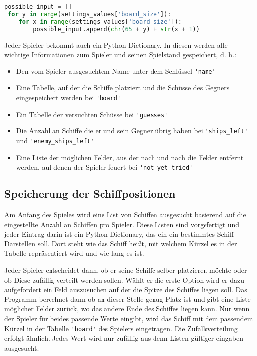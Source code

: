 \documentclass{article}
\begin{document}
\begin{lstlisting}[language=Python, caption = Herstellung einer Liste allen möglichen Felder, label=lst:possible input]
 possible_input = []
 for y in range(settings_values['board_size']):
    for x in range(settings_values['board_size']):
        possible_input.append(chr(65 + y) + str(x + 1))
\end{lstlisting}

    Jeder Spieler bekommt auch ein Python-Dictionary. In diesen werden alle wichtige Informationen zum Spieler und seinen Spielstand gespeichert, d. h.:

\setlist{}%
\begin{itemize}
\itemsep0em
  \item Den vom Spieler ausgesuchtem Name unter dem Schlüssel \verb$'name'$
  \item Eine Tabelle, auf der die Schiffe platziert und die Schüsse des Gegners eingespeichert werden bei \verb$'board'$
  \item Ein Tabelle der versuchten Schüsse bei \verb$'guesses'$
  \item Die Anzahl an Schiffe die er und sein Gegner übrig haben bei \verb$'ships_left'$ und \verb$'enemy_ships_left'$
  \item Eine Liste der möglichen Felder, aus der nach und nach die Felder entfernt werden, auf denen der Spieler feuert bei \verb$'not_yet_tried'$
\end{itemize}

\subsection{Speicherung der Schiffpositionen}
    Am Anfang des Spieles wird eine List von Schiffen ausgesucht basierend auf die eingestellte Anzahl an Schiffen pro Spieler. Diese Listen sind vorgefertigt und jeder Eintrag darin ist ein Python-Dictionary, das ein ein bestimmtes Schiff Darstellen soll. Dort steht wie das Schiff heißt, mit welchem Kürzel es in der Tabelle repräsentiert wird und wie lang es ist.\\

\par
    Jeder Spieler entscheidet dann, ob er seine Schiffe selber platzieren möchte oder ob Diese zufällig verteilt werden sollen. Wählt er die erste Option wird er dazu aufgefordert ein Feld auszusuchen auf der die Spitze des Schiffes liegen soll. Das Programm berechnet dann ob an dieser Stelle genug Platz ist und gibt eine Liste möglicher Felder zurück, wo das andere Ende des Schiffes liegen kann. Nur wenn der Spieler für beides passende Werte eingibt, wird das Schiff mit dem passendem Kürzel in der Tabelle \verb$'board'$ des Spielers eingetragen. Die Zufallsverteilung erfolgt ähnlich. Jedes Wert wird nur zufällig aus denn Listen gültiger eingaben ausgesucht.
\end{document}
